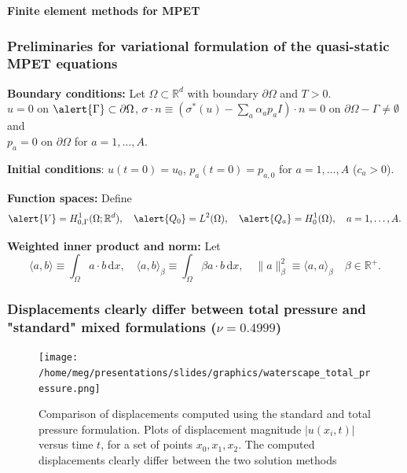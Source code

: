 \documentclass[mathserif, aspectratio=169]{beamer}
\newcommand{\R}{\mathbb{R}}
\newcommand{\inner}[2]{\langle #1,  #2\rangle}
\newcommand{\dx}{\, \mathrm{d}x}
\newcommand{\mysection}[1]{\begin{frame} \begin{center} \vspace{3em} \textbf{#1} \end{center} \end{frame}}
\DeclareMathOperator{\ssum}{\textstyle \sum}
\begin{document}





\mysection{Finite element methods for MPET}

\begin{frame}
  \frametitle{Preliminaries for variational formulation of the
    quasi-static MPET equations}

  \textbf{Boundary conditions:} Let $\Omega \subset \R^d$ with boundary
  $\partial \Omega$ and $T > 0$. \\ $u = 0$ on $\alert{\Gamma} \subset \partial
  \Omega$, $\sigma \cdot n \equiv (\sigma^{\ast}(u) - \ssum_{a}
  \alpha_a p_a I) \cdot n = 0$ on $\partial \Omega - \Gamma \not =
  \emptyset$ and \\ $p_a = 0$ on $\partial \Omega$ for $a = 1, \dots, A$.

  \medskip
  
  \textbf{Initial conditions}: $u(t = 0) = u_0$, $p_a(t = 0) = p_{a,
    0}$ for $a = 1, \dots, A$ ($c_a > 0$).

  \bigskip
  
  \textbf{Function spaces:} Define
  \begin{equation*}
    \alert{V} = H^1_{0, \Gamma}(\Omega; \R^d),
    \quad
    \alert{Q_0} = L^2(\Omega),
    \quad
    \alert{Q_a} = H^1_0(\Omega), \quad a = 1, \dots, A.
  \end{equation*}

  \bigskip

  \textbf{Weighted inner product and norm:} Let
  \begin{equation*}
    \inner{a}{b} \equiv \int_{\Omega} a \cdot b \dx,
    \quad
    \inner{a}{b}_{\beta} \equiv \int_{\Omega} \beta a \cdot b \dx,
    \quad
    \| a \|_{\beta}^2 \equiv \inner{a}{a}_{\beta}
    \quad
    \beta \in \R^{+} .
  \end{equation*}
\end{frame}






\begin{frame}
  \frametitle{Displacements clearly differ between total pressure and "standard" mixed formulations ($\nu = 0.4999$)}
  \centering
  \begin{figure}
  \texttt{[image: /home/meg/presentations/slides/graphics/waterscape\_total\_pressure.png]}
  \caption{Comparison of displacements computed using the standard and
    total pressure formulation. Plots of displacement magnitude
    $|u(x_i, t)|$ versus time $t$, for a set of points $x_0, x_1,
    x_2$. The computed displacements clearly differ between the two
    solution methods}
  \end{figure}
\end{frame}
\end{document}
